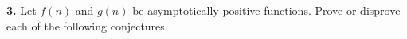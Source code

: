 \documentclass[addpoints]{exam}
\begin{document}
\begin{questions}
  \question
  \textbf{3. } Let $ f(n) $ and $ g(n) $ be asymptotically positive functions. Prove or disprove each of the following conjectures.


  \begin{solution}
\end{solution}
\end{questions}
\end{document}
